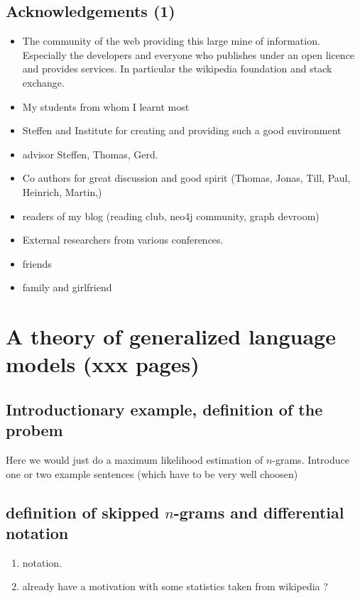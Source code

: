 \documentclass[•]{book}
\begin{document}
\section{Acknowledgements (1)}
\begin{itemize}
\item The community of the web providing this large mine of information. Especially the developers and everyone who publishes under an open licence and provides services. In particular the wikipedia foundation and stack exchange. 
\item My students from whom I learnt most
\item Steffen and Institute for creating and providing such a good environment
\item advisor Steffen, Thomas, Gerd.
\item Co authors for great discussion and good spirit (Thomas, Jonas, Till, Paul, Heinrich, Martin,)
\item readers of my blog (reading club, neo4j community, graph devroom)
\item External researchers from various conferences.\item friends
\item family and girlfriend

\end{itemize}

\chapter{A theory of generalized language models (xxx pages)}
\section{Introductionary example, definition of the probem}
Here we would just do a maximum likelihood estimation of $n$-grams. 
Introduce one or two example sentences (which have to be very well choosen)
\section{definition of skipped $n$-grams and differential notation}
\begin{enumerate}
\item notation. 
\item already have a motivation with some statistics taken from wikipedia ? 
\end{enumerate}
\end{document}
